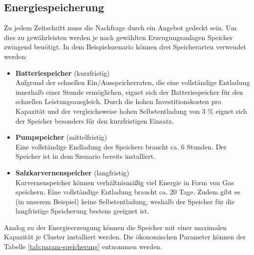 \subsection{Energiespeicherung}
Zu jedem Zeitschritt muss die Nachfrage durch ein Angebot gedeckt sein. Um dies zu gewährleisten werden je nach gewählten Erzeugungsanlagen Speicher zwingend benötigt.
In dem Beispielszenario können drei Speicherarten verwendet werden:
\begin{itemize}
    \item \textbf{Batteriespeicher} (kurzfristig)\\Aufgrund der schnellen Ein/Ausspeicherraten, die eine vollständige Entladung innerhalb einer Stunde ermöglichen, eignet sich der Batteriespeicher für den schnellen Leistungsausgleich. Durch die hohen Investitionskosten pro Kapazität und der vergleichsweise hohen Selbstentladung von 3 \% eignet sich der Speicher besonders für den kurzfristigen Einsatz.
    \item \textbf{Pumpspeicher} (mittelfristig)\\Eine vollständige Endladung des Speichers braucht ca. 6 Stunden. Der Speicher ist in dem Szenario bereits installiert.
    \item \textbf{Salzkarvernenspeicher} (langfristig)\\Karvernenspeicher können verhältnismäßig viel Energie in Form von Gas speichern. Eine vollständige Entladung braucht ca. 20 Tage. Zudem gibt es (in unserem Beispiel) keine Selbstentladung, weshalb der Speicher für die langfristige Speicherung bestens geeignet ist.   
\end{itemize}    

Analog zu der Energieerzeugung können die Speicher mit einer maximalen Kapazität je Cluster installiert werden. Die ökonomischen Parameter können der Tabelle \ref{tab:param-speicherung} entnommen werden.

